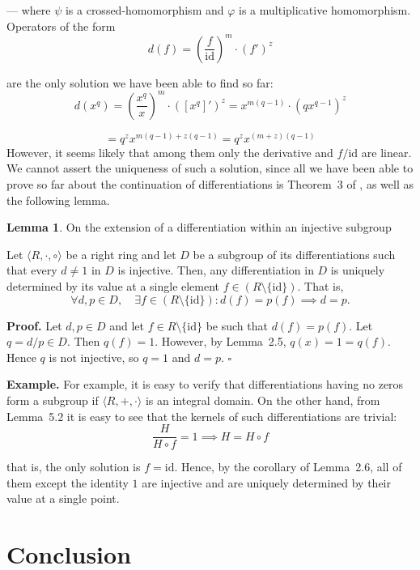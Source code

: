 \documentclass[12pt]{article}
\theoremstyle{definition}
\newtheorem{lemma}[definition]{Lemma}
\begin{document}
--- where \(\psi\) is a crossed-homomorphism and \(\varphi\) is a multiplicative homomorphism. Operators of the form
\[
d(f) = \left( \frac{f}{\mathrm{id}} \right)^m \cdot (f')^z
\]

are the only solution we have been able to find so far:
\[
d(x^q) = \left( \frac{x^q}{x} \right)^m \cdot ([x^q]')^z = x^{m(q-1)} \cdot (q x^{q-1})^z 
\]

\[
= q^z x^{m(q-1) + z(q-1)} = q^z x^{(m+z)(q-1)}
\]
However, it seems likely that among them only the derivative and \(f/\mathrm{id}\) are linear. 
We cannot assert the uniqueness of such a solution, since all we have been able to prove so far 
about the continuation of differentiations is Theorem~3 of \cite{umerov2025}, as well as the following lemma.

\vspace{10pt}
\begin{lemma} On the extension of a differentiation within an injective subgroup

\vspace{5pt}
Let \(\langle R, \cdot, \circ \rangle\) be a right ring and let $D$ be a subgroup of its 
differentiations such that every $d \neq 1$ in $D$ is injective. Then, any differentiation in $D$ is uniquely 
determined by its value at a single element $f \in (R \setminus \{\mathrm{id}\})$. That is,
\[
\forall d, p \in D, \quad \exists f \in (R \setminus \{\mathrm{id}\}) : d(f) = p(f) \implies d = p.
\]

\vspace{10pt}
\textbf{Proof.} 
Let \(d, p \in D\) and let \(f \in R \setminus \{\mathrm{id}\}\) be such that \(d(f) = p(f)\). 
Let \(q = d/p \in D\). Then \(q(f) = 1\). However, by Lemma~2.5, \(q(x) = 1 = q(f)\). 
Hence \(q\) is not injective, so \(q = 1\) and \(d = p\). $\square$
\end{lemma}

\newpage
\noindent\textbf{Example.} For example, it is easy to verify that differentiations having no zeros form a subgroup 
if \(\langle R, +, \cdot \rangle\) is an integral domain. On the other hand, from Lemma~5.2 it is easy to see 
that the kernels of such differentiations are trivial:
\[
\frac{H}{H \circ f} = 1 \implies H = H \circ f
\]

that is, the only solution is \(f = \mathrm{id}\). Hence, by the corollary of Lemma~2.6, all of 
them except the identity \(1\) are injective and are uniquely determined by their value at a single point.

\section{Conclusion}
\end{document}

